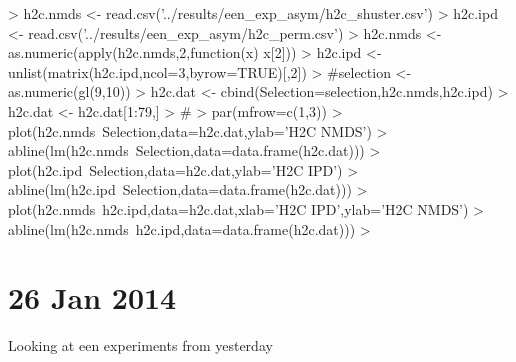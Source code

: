 \documentclass[12pt]{article}
\begin{document}
\begin{Schunk}
\begin{Sinput}
> h2c.nmds <- read.csv('../results/een_exp_asym/h2c_shuster.csv')
> h2c.ipd <- read.csv('../results/een_exp_asym/h2c_perm.csv')
> h2c.nmds <- as.numeric(apply(h2c.nmds,2,function(x) x[2]))
> h2c.ipd <- unlist(matrix(h2c.ipd,ncol=3,byrow=TRUE)[,2])
> #selection <- as.numeric(gl(9,10))
> h2c.dat <- cbind(Selection=selection,h2c.nmds,h2c.ipd)
> h2c.dat <- h2c.dat[1:79,]
>                                         #
> par(mfrow=c(1,3))
> plot(h2c.nmds~Selection,data=h2c.dat,ylab='H2C NMDS')
> abline(lm(h2c.nmds~Selection,data=data.frame(h2c.dat)))
> plot(h2c.ipd~Selection,data=h2c.dat,ylab='H2C IPD')
> abline(lm(h2c.ipd~Selection,data=data.frame(h2c.dat)))
> plot(h2c.nmds~h2c.ipd,data=h2c.dat,xlab='H2C IPD',ylab='H2C NMDS')
> abline(lm(h2c.nmds~h2c.ipd,data=data.frame(h2c.dat)))
> 
\end{Sinput}
\end{Schunk}

\section{26 Jan 2014}

Looking at een experiments from yesterday
\end{document}
